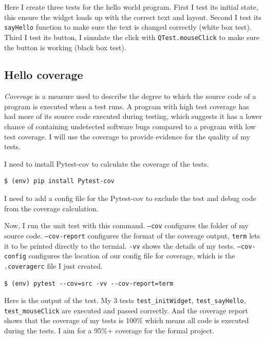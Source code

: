 \documentclass[a4paper]{report}
\begin{document}
Here I create three tests for the hello world program. First I test its initial state, this ensure the widget loads up with the correct text and layout. Second I test its \texttt{sayHello} function to make sure the text is changed correctly (white box test). Third I test its button, I simulate the click with \texttt{QTest.mouseClick} to make sure the button is working (black box test).


\subsection{Hello coverage}

\emph{Coverage} is a measure used to describe the degree to which the source code of a program is executed when a test runs. A program with high test coverage has had more of its source code executed during testing, which suggests it has a lower chance of containing undetected software bugs compared to a program with low test coverage. I will use the coverage to provide evidence for the quality of my tests.

I need to install Pytest-cov to calculate the coverage of the tests.

\begin{verbatim}
$ (env) pip install Pytest-cov
\end{verbatim}

I need to add a config file for the Pytest-cov to exclude the test and debug code from the coverage calculation.


Now, I run the unit test with this command. \texttt{--cov} configures the folder of my source code. \texttt{--cov-report} configures the format of the coverage output, \texttt{term} lets it to be printed directly to the termial. \texttt{-vv} shows the details of my tests. \texttt{--cov-config} configures the location of our config file for coverage, which is the \texttt{.coveragerc} file I just created.

\begin{verbatim}
$ (env) pytest --cov=src -vv --cov-report=term
\end{verbatim}

Here is the output of the test. My 3 tests \texttt{test_initWidget}, \texttt{test_sayHello}, \texttt{test_mouseClick} are executed and passed correctly. And the coverage report shows that the coverage of my tests is 100\% which means all code is executed during the tests. I aim for a 95\%+ coverage for the formal project.
\end{document}
